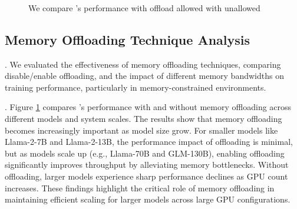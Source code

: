 \begin{figure}[htbp]
  \centering
    \\
    \addtocounter{subfigure}{-1}
    
    \\
    \\
  \caption{
  We compare \sysname's performance with offload allowed with unallowed
  }
  \label{fig:ablation:offload}
\end{figure}

\subsection{Memory Offloading Technique Analysis}

. We evaluated the effectiveness of memory offloading techniques, comparing disable/enable offloading, and the impact of different memory bandwidths on training performance, particularly in memory-constrained environments.

.
Figure \ref{fig:ablation:offload} compares \sysname's performance with and without memory offloading across different models and system scales. The results show that memory offloading becomes increasingly important as model size grow. For smaller models like Llama-2-7B and Llama-2-13B, the performance impact of offloading is minimal, but as models scale up (e.g., Llama-70B and GLM-130B), enabling offloading significantly improves throughput by alleviating memory bottlenecks. Without offloading, larger models experience sharp performance declines as GPU count increases. These findings highlight the critical role of memory offloading in maintaining efficient scaling for larger models across large GPU configurations.


